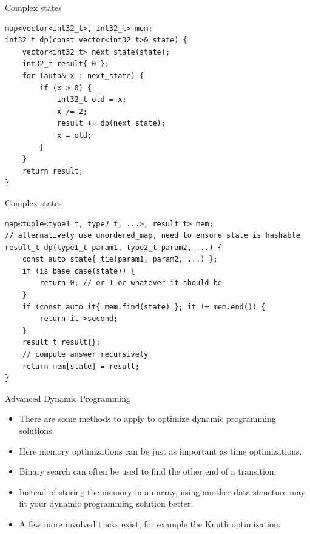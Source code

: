\documentclass{beamer}
\begin{document}
\begin{frame}{Complex states}
    \begin{verbatim}
map<vector<int32_t>, int32_t> mem;
int32_t dp(const vector<int32_t>& state) {
    vector<int32_t> next_state(state);
    int32_t result{ 0 };
    for (auto& x : next_state) {
        if (x > 0) {
            int32_t old = x;
            x /= 2;
            result += dp(next_state);
            x = old;
        }
    }
    return result;
}
    \end{verbatim}
\end{frame}

\begin{frame}{Complex states}
    \begin{verbatim}
map<tuple<type1_t, type2_t, ...>, result_t> mem;
// alternatively use unordered_map, need to ensure state is hashable
result_t dp(type1_t param1, type2_t param2, ...) {
    const auto state{ tie(param1, param2, ...) };
    if (is_base_case(state)) {
        return 0; // or 1 or whatever it should be
    }
    if (const auto it{ mem.find(state) }; it != mem.end()) {
        return it->second;
    }
    result_t result{};
    // compute answer recursively
    return mem[state] = result;
}
    \end{verbatim}
\end{frame}

\begin{frame}[plain]{Advanced Dynamic Programming}
    \begin{itemize}
        \item There are some methods to apply to optimize dynamic programming solutions.
        \item Here memory optimizations can be just as important as time optimizations.
        \item Binary search can often be used to find the other end of a transition.
        \item Instead of storing the memory in an array, using another data structure may fit your dynamic programming solution better.
        \item A few more involved tricks exist, for example the Knuth optimization.
    \end{itemize}
\end{frame}
\end{document}
